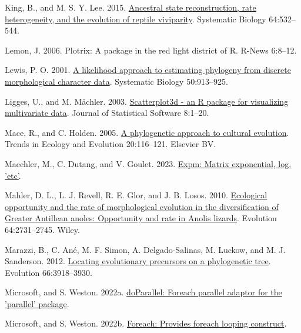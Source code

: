 \documentclass[fleqn,10pt,lineno]{wlpeerj} %
\newlength{\cslhangindent}
\newenvironment{CSLReferences}[2] %
 {\begin{list}{}{%
  \setlength{\itemindent}{0pt}
  \setlength{\leftmargin}{0pt}
  \setlength{\parsep}{0pt}
  \ifodd #1
   \setlength{\leftmargin}{\cslhangindent}
   \setlength{\itemindent}{-1\cslhangindent}
  \fi
  \setlength{\itemsep}{#2\baselineskip}}}
 {\end{list}}
\begin{document}
\begin{CSLReferences}{1}{0}
King, B., and M. S. Y. Lee. 2015. \href{https://doi.org/10.1093/sysbio/syv005}{Ancestral state reconstruction, rate heterogeneity, and the evolution of reptile viviparity}. Systematic Biology 64:532--544.

Lemon, J. 2006. Plotrix: A package in the red light district of {R}. R-News 6:8--12.

Lewis, P. O. 2001. \href{https://doi.org/10.1080/106351501753462876}{A likelihood approach to estimating phylogeny from discrete morphological character data}. Systematic Biology 50:913--925.

Ligges, U., and M. Mächler. 2003. \href{https://doi.org/10.18637/jss.v008.i11}{Scatterplot3d - an {R} package for visualizing multivariate data}. Journal of Statistical Software 8:1--20.

Mace, R., and C. Holden. 2005. \href{https://doi.org/10.1016/j.tree.2004.12.002}{A phylogenetic approach to cultural evolution}. Trends in Ecology and Evolution 20:116--121. Elsevier BV.

Maechler, M., C. Dutang, and V. Goulet. 2023. \href{https://CRAN.R-project.org/package=expm}{Expm: Matrix exponential, log, 'etc'}.

Mahler, D. L., L. J. Revell, R. E. Glor, and J. B. Losos. 2010. \href{https://doi.org/10.1111/j.1558-5646.2010.01026.x}{Ecological opportunity and the rate of morphological evolution in the diversification of {G}reater {A}ntillean anoles: Opportunity and rate in {A}nolis lizards}. Evolution 64:2731--2745. Wiley.

Marazzi, B., C. Ané, M. F. Simon, A. Delgado-Salinas, M. Luckow, and M. J. Sanderson. 2012. \href{https://doi.org/10.1111/j.1558-5646.2012.01720.x}{Locating evolutionary precursors on a phylogenetic tree}. Evolution 66:3918--3930.

Microsoft, and S. Weston. 2022a. \href{https://CRAN.R-project.org/package=doParallel}{doParallel: Foreach parallel adaptor for the 'parallel' package}.

Microsoft, and S. Weston. 2022b. \href{https://CRAN.R-project.org/package=foreach}{Foreach: Provides foreach looping construct}.


\end{CSLReferences}
\end{document}
